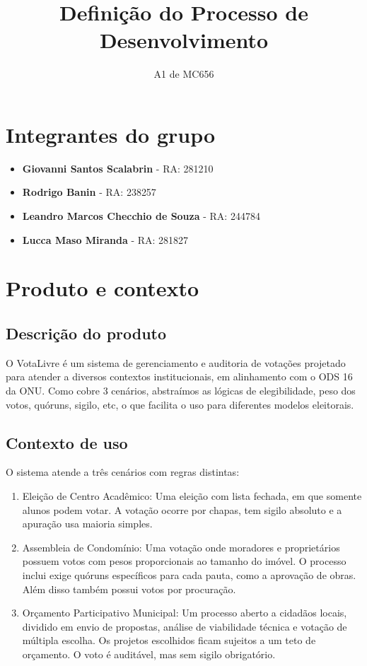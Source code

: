 \documentclass[12pt,a4paper]{article}
\title{\textbf{Definição do Processo de Desenvolvimento}}
\author{A1 de MC656}
\date{}
\begin{document}
\maketitle

\section{Integrantes do grupo}
\begin{itemize}
    \item \textbf{Giovanni Santos Scalabrin} - RA: 281210
    \item \textbf{Rodrigo Banin} - RA: 238257
    \item \textbf{Leandro Marcos Checchio de Souza} - RA: 244784
    \item \textbf{Lucca Maso Miranda} - RA: 281827
\end{itemize}

\section{Produto e contexto}
\subsection{Descrição do produto}
O VotaLivre é um sistema de gerenciamento e auditoria de votações projetado para atender a diversos contextos institucionais, em alinhamento com o ODS 16 da ONU. Como cobre 3 cenários, abstraímos as lógicas de elegibilidade, peso dos votos, quóruns, sigilo, etc, o que facilita o uso para diferentes modelos eleitorais.

\subsection{Contexto de uso}
O sistema atende a três cenários com regras distintas:
\begin{enumerate}
    \item Eleição de Centro Acadêmico: Uma eleição com lista fechada, em que somente alunos podem votar. A votação ocorre por chapas, tem sigilo absoluto e a apuração usa maioria simples.
    \item Assembleia de Condomínio: Uma votação onde moradores e proprietários possuem votos com pesos proporcionais ao tamanho do imóvel. O processo inclui exige quóruns específicos para cada pauta, como a aprovação de obras. Além disso também possui votos por procuração.
    \item Orçamento Participativo Municipal: Um processo aberto a cidadãos locais, dividido em envio de propostas, análise de viabilidade técnica e votação de múltipla escolha. Os projetos escolhidos ficam sujeitos a um teto de orçamento. O voto é auditável, mas sem sigilo obrigatório.
\end{enumerate}
\end{document}
